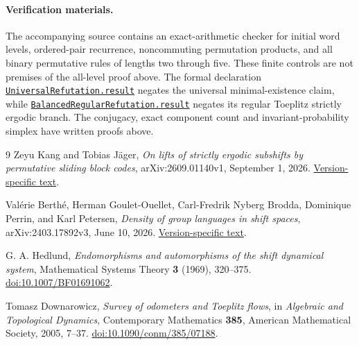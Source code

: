 \documentclass[11pt]{article}
\begin{document}
\paragraph{Verification materials.}
The accompanying source contains an exact-arithmetic checker for initial word levels, ordered-pair recurrence, noncommuting permutation products, and all binary permutative rules of lengths two through five. These finite controls are not premises of the all-level proof above. The formal declaration
\href{https://github.com/the-omega-institute/trureturing/blob/fd1633144086085a16f35c8171e2f4b6186a6fbb/D5/S1/Dynamics/Symbolic/PermutativeLifts/UniversalRefutation.lean}{\texttt{UniversalRefutation.result}}
negates the universal minimal-existence claim, while
\href{https://github.com/the-omega-institute/trureturing/blob/fd1633144086085a16f35c8171e2f4b6186a6fbb/D5/S1/Dynamics/Symbolic/PermutativeLifts/BalancedRegularRefutation.lean}{\texttt{BalancedRegularRefutation.result}}
negates its regular Toeplitz strictly ergodic branch. The conjugacy, exact component count and invariant-probability simplex have written proofs above.

\begin{thebibliography}{9}
 Zeyu Kang and Tobias J\"ager,
\emph{On lifts of strictly ergodic subshifts by permutative sliding block codes},
arXiv:2609.01140v1, September 1, 2026.
\href{https://arxiv.org/html/2609.01140v1}{Version-specific text}.

 Val\'erie Berth\'e, Herman Goulet-Ouellet,
Carl-Fredrik Nyberg Brodda, Dominique Perrin, and Karl Petersen,
\emph{Density of group languages in shift spaces},
arXiv:2403.17892v3, June 10, 2026.
\href{https://arxiv.org/html/2403.17892v3}{Version-specific text}.

 G. A. Hedlund,
\emph{Endomorphisms and automorphisms of the shift dynamical system},
Mathematical Systems Theory \textbf{3} (1969), 320--375.
\href{https://doi.org/10.1007/BF01691062}{doi:10.1007/BF01691062}.

 Tomasz Downarowicz,
\emph{Survey of odometers and Toeplitz flows},
in \emph{Algebraic and Topological Dynamics}, Contemporary Mathematics
\textbf{385}, American Mathematical Society, 2005, 7--37.
\href{https://doi.org/10.1090/conm/385/07188}{doi:10.1090/conm/385/07188}.
\end{thebibliography}
\end{document}
